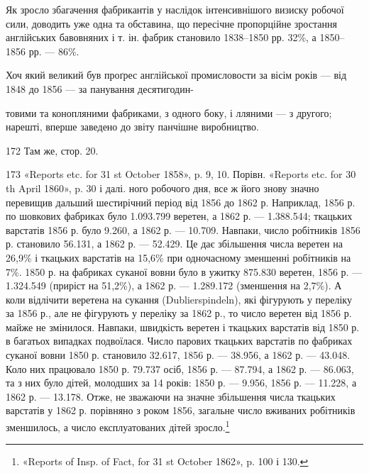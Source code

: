 Як зросло збагачення фабрикантів у наслідок інтенсивнішого
визиску робочої сили, доводить уже одна та обставина, що пересічне
пропорційне зростання англійських бавовняних і т. ін.
фабрик становило 1838--1850 рр. 32\%, а 1850--1856 рр. — 86\%.

Хоч який великий був проґрес англійської промисловости
за вісім років — від 1848 до 1856 — за панування десятигодин-

товими та конопляними фабриками, з одного боку, і лляними — з другого;
нарешті, вперше заведено до звіту панчішне виробництво.

172 Там же, стор. 20.

173 «Reports etc. for 31 st October 1858», p. 9, 10. Порівн. «Reports
etc. for 30 th April 1860», p. 30 і далі.
ного робочого дня, все ж його знову значно перевищив дальший
шестирічний період від 1856 до 1862 р. Наприклад, 1856 р. по
шовкових фабриках було 1.093.799 веретен, а 1862 р. — 1.388.544;
ткацьких варстатів 1856 р. було 9.260, а 1862 р. — 10.709. Навпаки,
число робітників 1856 р. становило 56.131, а 1862 р. — 52.429.
Це дає збільшення числа веретен на 26,9\% і ткацьких варстатів
на 15,6\% при одночасному зменшенні робітників на 7\%. 1850 р. на
фабриках суканої вовни було в ужитку 875.830 веретен, 1856 р. —
1.324.549 (приріст на 51,2\%), а 1862 р. — 1.289.172 (зменшення
на 2,7\%). А коли відлічити веретена на сукання (Dublierspindeln),
які фігурують у переліку за 1856 р., але не фігурують у переліку
за 1862 р., то число веретен від 1856 р. майже не змінилося. Навпаки,
швидкість веретен і ткацьких варстатів від 1850 р. в
багатьох випадках подвоїлася. Число парових ткацьких варстатів
по фабриках суканої вовни 1850 р. становило 32.617,
1856 р. — 38.956, а 1862 р. — 43.048. Коло них працювало 1850 р.
79.737 осіб, 1856 р. — 87.794, а 1862 р. — 86.063, та з них було
дітей, молодших за 14 років: 1850 р. — 9.956, 1856 р. — 11.228,
а 1862 р. — 13.178. Отже, не зважаючи на значне збільшення
числа ткацьких варстатів у 1862 р. порівняно з роком 1856, загальне
число вживаних робітників зменшилось, а число експлуатованих
дітей зросло.\footnote{
«Reports of Insp. of Fact, for 31 st October 1862», p. 100 і 130.
}


